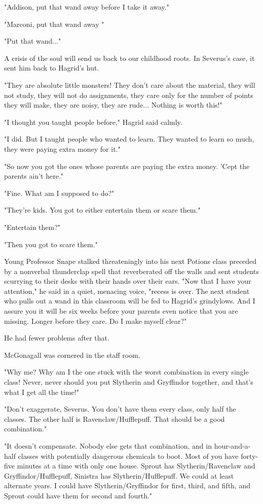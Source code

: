 "Addison, put that wand away before I take it away."

"Marconi, put that wand away "

"Put that wand..."

A crisis of the soul will send us back to our childhood roots. In Severus's case, it sent him back to Hagrid's hut.

"They are absolute little monsters! They don't care about the material, they will not study, they will not do assignments, they care only for the number of points they will make, they are noisy, they are rude... Nothing is worth this!"

"I thought you taught people before," Hagrid said calmly.

"I did. But I taught people who wanted to learn. They wanted to learn so much, they were paying extra money for it."

"So now you got the ones whose parents are paying the extra money. 'Cept the parents ain't here."

"Fine. What am I supposed to do?"

"They're kids. You got to either entertain them or scare them."

"Entertain them?"

"Then you got to scare them."

Young Professor Snape stalked threateningly into his next Potions class preceded by a nonverbal thunderclap spell that reverberated off the walls and sent students scurrying to their desks with their hands over their ears. "Now that I have your attention," he said in a quiet, menacing voice, "recess is over. The next student who pulls out a wand in this classroom will be fed to Hagrid's grindylows. And I assure you it will be six weeks before your parents even notice that you are missing. Longer before they care. Do I make myself clear?"

He had fewer problems after that.

McGonagall was cornered in the staff room.

"Why me? Why am I the one stuck with the worst combination in every single class! Never, never should you put Slytherin and Gryffindor together, and that's what I get all the time!"

"Don't exaggerate, Severus. You don't have them every class, only half the classes. The other half is Ravenclaw\slash Hufflepuff. That should be a good combination."

"It doesn't compensate. Nobody else gets that combination, and in hour-and-a-half classes with potentially dangerous chemicals to boot. Most of you have forty-five minutes at a time with only one house. Sprout has Slytherin\slash Ravenclaw and Gryffindor\slash Hufflepuff, Sinistra has Slytherin\slash Hufflepuff. We could at least alternate years. I could have Slytherin\slash Gryffindor for first, third, and fifth, and Sprout could have them for second and fourth."

